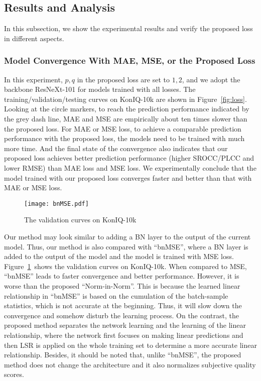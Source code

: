 \documentclass[sigconf]{acmart}
\begin{document}
\subsection{Results and Analysis}
In this subsection, we show the experimental results and verify the proposed loss in different aspects. 

\subsubsection{Model Convergence With MAE, MSE, or the Proposed Loss}
\label{sec:loss-exp}
In this experiment, $p,q$ in the proposed loss are set to $1,2$, and we adopt the backbone ResNeXt-101 for models trained with all losses. 
The training/validation/testing curves on KonIQ-10k are shown in Figure~\ref{fig:loss}. 
Looking at the circle markers, to reach the prediction performance indicated by the grey dash line, MAE and MSE are empirically about ten times slower than the proposed loss.  
For MAE or MSE loss, to achieve a comparable prediction performance with the proposed loss, the models need to be trained with much more time.
And the final state of the convergence also indicates that our proposed loss achieves better prediction performance (higher SROCC/PLCC and lower RMSE) than MAE loss and MSE loss.
We experimentally conclude that the model trained with our proposed loss converges faster and better than that with MAE or MSE loss.

\begin{figure}[!htb]
    \centering
    \texttt{[image: bnMSE.pdf]}
    \caption{The validation curves on KonIQ-10k}
    \label{fig:bnMSE}
\end{figure}

Our method may look similar to adding a BN layer to the output of the current model. 
Thus, our method is also compared with ``bnMSE'', where a BN layer is added to the output of the model and the model is trained with MSE loss. 
Figure~\ref{fig:bnMSE}~shows the validation curves on KonIQ-10k. 
When compared to MSE, ``bnMSE'' leads to faster convergence and better performance. 
However, it is worse than the proposed ``Norm-in-Norm''. 
This is because the learned linear relationship in ``bnMSE'' is based on the cumulation of the batch-sample statistics, which is not accurate at the beginning.
Thus, it will slow down the convergence and somehow disturb the learning process.
On the contrast, the proposed method separates the network learning and the learning of the linear relationship, where the network first focuses on making linear predictions and then LSR is applied on the whole training set to determine a more accurate linear relationship.
Besides, it should be noted that, unlike ``bnMSE'', the proposed method does not change the architecture and it also normalizes subjective quality scores.
\end{document}
